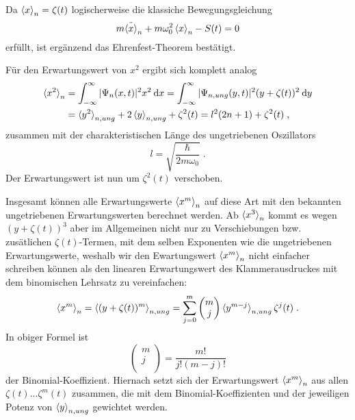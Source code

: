     Da $\braket{x}_n=\zeta(t)$ logischerweise die klassiche Bewegungsgleichung
    \begin{equation}
      m\ddot{\braket{x}}_n + m\omega_0^2\braket{x}_n - S(t) = 0
    \end{equation}
    erfüllt, ist ergänzend das Ehrenfest-Theorem bestätigt.

    Für den Erwartungswert von $x^2$ ergibt sich komplett analog
    \begin{align}
      \braket{x^2}_n &= \int_{-\infty}^{\infty} |\Psi_n(x,t)|^2 x^2 \: \text dx
      = \int_{-\infty}^{\infty} |\Psi_{n,ung}(y,t)|^2 (y+\zeta(t))^2 \: \text dy \notag \\
      &= \braket{y^2}_{n,ung} + 2\braket{y}_{n,ung} + \zeta^2(t)
      = l^2(2n+1) + \zeta^2(t) \; ,
    \end{align}
    zusammen mit der charakteristischen Länge des ungetriebenen Oszillators
    \begin{equation}
      l = \sqrt{\frac{\hbar}{2m\omega_0}} \; .
    \end{equation}
    Der Erwartungswert ist nun um $\zeta^2(t)$ verschoben.

    Insgesamt können alle Erwartungswerte $\braket{x^m}_n$ auf diese Art mit den bekannten ungetriebenen Erwartungswerten berechnet werden.
    Ab $\braket{x^3}_n$ kommt es wegen $(y+\zeta(t))^3$ aber im Allgemeinen nicht nur zu Verschiebungen bzw. zusätlichen $\zeta(t)$-Termen, mit dem selben Exponenten wie die ungetriebenen Erwartungswerte, weshalb wir den Ewartungswert $\braket{x^m}_n$ nicht einfacher schreiben können als den linearen Erwartungswert des Klammerausdruckes mit dem binomischen Lehrsatz \cite{binom} zu vereinfachen:
    \begin{equation}
      \braket{x^m}_n = \braket{(y+\zeta(t))^m}_{n,ung} = \sum_{j=0}^m \begin{pmatrix} m \\ j \\ \end{pmatrix} \braket{y^{m-j}}_{n,ung}\zeta^j(t) \; .
    \end{equation}
    In obiger Formel ist
    \begin{equation}
      \begin{pmatrix} m \\ j \\ \end{pmatrix} = \frac{m!}{j!(m-j)!}
    \end{equation}
    der Binomial-Koeffizient.
    Hiernach setzt sich der Erwartungswert $\braket{x^m}_n$ aus allen $\zeta(t)...\zeta^m(t)$ zusammen, die mit dem Binomial-Koeffizienten und der jeweiligen Potenz von $\braket{y}_{n,ung}$ gewichtet werden.



